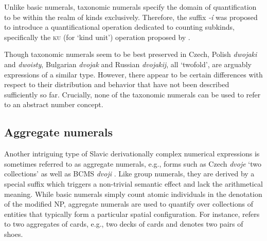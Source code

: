 \documentclass[output=paper]{langscibook}
\begin{document}
	\ea\label{ex:taxonomic-czech} \label{ex:taxonomic-czech-dvoji-housle}
	\label{ex:taxonomic-czech-dvoji-vino}
	\z
	\z
	
	\noindent Unlike basic numerals, taxonomic numerals specify the domain of quantification to be within the realm of kinds exclusively. Therefore, the suffix \textit{-í} was proposed to introduce a quantificational operation dedicated to counting subkinds, specifically the \textsc{ku} (for `kind unit') operation proposed by \citet{krifka1995common}.
	
	Though taxonomic numerals seem to be best preserved in Czech, Polish \textit{dwojaki} and \textit{dwoisty}, Bulgarian \textit{dvojak} and Russian \textit{dvojakij}, all `twofold', are arguably expressions of a similar type. However, there appear to be certain differences with respect to their distribution and behavior that have not been described sufficiently so far. Crucially, none of the taxonomic numerals can be used to refer to an abstract number concept.
	
		\subsection{Aggregate numerals}
	
	Another intriguing type of Slavic derivationally complex numerical expressions is sometimes referred to as aggregate numerals, e.g., forms such as Czech \textit{dvoje} `two collections' \citep{docekal2012atoms,docekal2013numerals} as well as BCMS \textit{dvoji} \citep{lucic2015observations}. Like group numerals, they are derived by a special suffix which triggers a non-trivial semantic effect and lack the arithmetical meaning. While basic numerals simply count atomic individuals in the denotation of the modified NP, aggregate numerals are used to quantify over collections of entities that typically form a particular spatial configuration. For instance,  refers to two aggregates of cards, e.g., two decks of cards and  denotes two pairs of shoes.
	
	\ea\label{ex:aggregate-czech} \label{ex:aggregate-czech-dvoje-karty}
	\label{ex:collective-czech-dvoje-boty}
	\z
	\z
\end{document}

